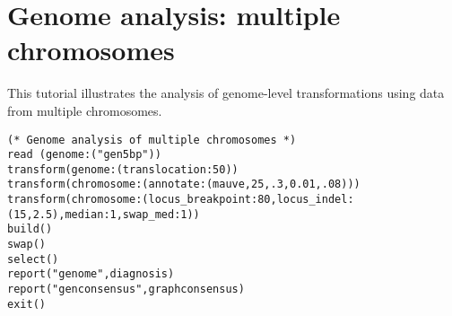 \section{Genome analysis: multiple chromosomes}{\label{tutorial 9}}

This tutorial illustrates the analysis of genome-level transformations using data from multiple chromosomes. 

\begin{verbatim}
(* Genome analysis of multiple chromosomes *)
read (genome:("gen5bp"))
transform(genome:(translocation:50))
transform(chromosome:(annotate:(mauve,25,.3,0.01,.08)))
transform(chromosome:(locus_breakpoint:80,locus_indel:
(15,2.5),median:1,swap_med:1))
build()
swap()
select()
report("genome",diagnosis)
report("genconsensus",graphconsensus)
exit()
\end{verbatim}

